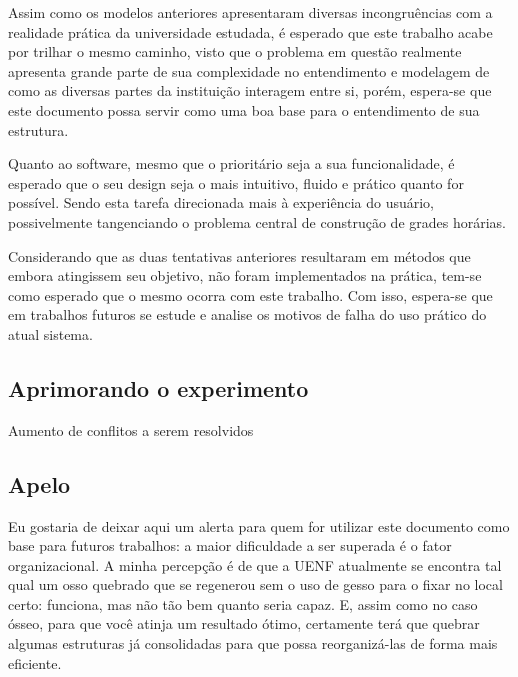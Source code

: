 Assim como os modelos anteriores apresentaram diversas incongruências com a realidade prática da universidade estudada, é esperado que este trabalho acabe por trilhar o mesmo caminho, visto que o problema em questão realmente apresenta grande parte de sua complexidade no entendimento e modelagem de como as diversas partes da instituição interagem entre si, porém, espera-se que este documento possa servir como uma boa base para o entendimento de sua estrutura.

Quanto ao software, mesmo que o prioritário seja a sua funcionalidade, é esperado que o seu design seja o mais intuitivo, fluido e prático quanto for possível. Sendo esta tarefa direcionada mais à experiência do usuário, possivelmente tangenciando o problema central de construção de grades horárias.

Considerando que as duas tentativas anteriores resultaram em métodos que embora atingissem seu objetivo, não foram implementados na prática, tem-se como esperado que o mesmo ocorra com este trabalho. Com isso, espera-se que em trabalhos futuros se estude e analise os motivos de falha do uso prático do atual sistema.



\subsection{Aprimorando o experimento}


Aumento de conflitos a serem resolvidos

\subsection*{Apelo}

Eu gostaria de deixar aqui um alerta para quem for utilizar este documento como base para futuros trabalhos: a maior dificuldade a ser superada é o fator organizacional. A minha percepção é de que a UENF atualmente se encontra tal qual um osso quebrado que se regenerou sem o uso de gesso para o fixar no local certo: funciona, mas não tão bem quanto seria capaz. E, assim como no caso ósseo, para que você atinja um resultado ótimo, certamente terá que quebrar algumas estruturas já consolidadas para que possa reorganizá-las de forma mais eficiente.

